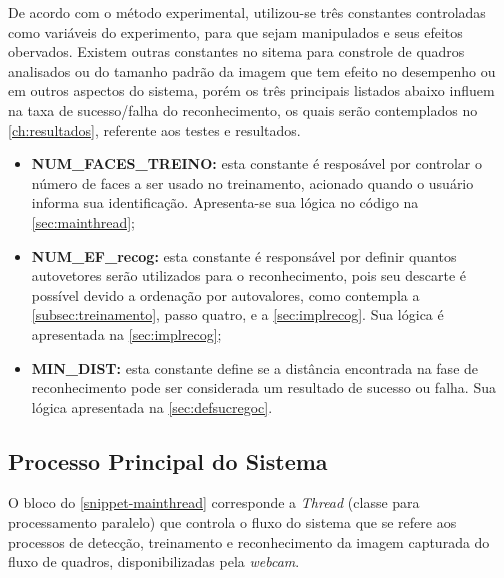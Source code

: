 De acordo com o método experimental, utilizou-se três constantes controladas como variáveis do experimento, para que sejam manipulados e seus efeitos obervados. Existem outras constantes no sitema para constrole de quadros analisados ou do tamanho padrão da imagem que tem efeito no desempenho ou em outros aspectos do sistema, porém os três principais listados abaixo influem na taxa de sucesso/falha do reconhecimento, os quais serão contemplados no \autoref{ch:resultados}, referente aos testes e resultados.

\begin{itemize}	
		\item \textbf{NUM\_FACES\_TREINO:} esta constante é resposável por controlar o número de faces a ser usado no treinamento, acionado quando o usuário informa sua identificação. Apresenta-se sua lógica no código na \autoref{sec:mainthread};
		
		\item \textbf{NUM\_EF\_recog:} esta constante é responsável por definir quantos autovetores serão utilizados para o reconhecimento, pois seu descarte é possível devido a ordenação por autovalores, como contempla a \autoref{subsec:treinamento}, passo quatro, e a \autoref{sec:implrecog}. Sua lógica é apresentada na \autoref{sec:implrecog};
		
		\item \textbf{MIN\_DIST:} esta constante define se a distância encontrada na fase de reconhecimento pode ser considerada um resultado de sucesso ou falha. Sua lógica apresentada na \autoref{sec:defsucregoc}.
\end{itemize}


\subsection{Processo Principal do Sistema}\label{sec:mainthread}

O bloco do \autoref{snippet-mainthread} corresponde a \textit{Thread} (classe para processamento paralelo) que controla o fluxo do sistema que se refere aos processos de detecção, treinamento e reconhecimento da imagem capturada do fluxo de quadros, disponibilizadas pela \textit{webcam}.




